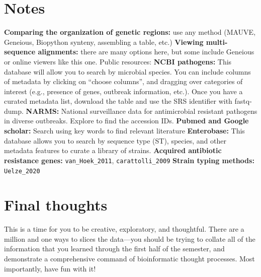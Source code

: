 \documentclass{article}
\begin{document}
\section*{Notes}
\begin{outline}[enumerate]
\1 \textbf{Comparing the organization of genetic regions:} use any method (MAUVE, Geneious, Biopython synteny, assembling a table, etc.)
\1 \textbf{Viewing multi-sequence alignments:} there are many options here, but some include Geneious or online viewers like this one.
\1 Public resources:
    \2 \textbf{NCBI pathogens:} This database will allow you to search by microbial species. You can include columns of metadata by clicking on “choose columns”, and dragging over categories of interest (e.g., presence of genes, outbreak information, etc.). Once you have a curated metadata list, download the table and use the SRS identifier with fastq-dump.
    \2 \textbf{NARMS: }National surveillance data for antimicrobial resistant pathogens in diverse outbreaks. Explore to find the accession IDs.
    \2 \textbf{Pubmed and Google scholar:} Search using key words to find relevant literature
    \2 \textbf{Enterobase:} This database allows you to search by sequence type (ST), species, and other metadata features to curate a library of strains.
    \2 \textbf{Acquired antibiotic resistance genes:} \texttt{van\_Hoek\_2011}, \texttt{carattolli\_2009}
    \2 \textbf{Strain typing methods:} \texttt{Uelze\_2020}
\end{outline}

\section*{Final thoughts}
This is a time for you to be creative, exploratory, and thoughtful. There are a million and one ways to slices the data---you should be trying to collate all of the information that you learned through the first half of the semester, and demonstrate a comprehensive command of bioinformatic thought processes. Most importantly, have fun with it!
\end{document}
